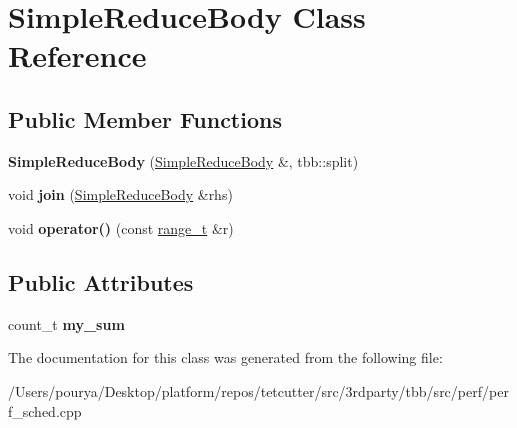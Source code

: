 \hypertarget{classSimpleReduceBody}{}\section{Simple\+Reduce\+Body Class Reference}
\label{classSimpleReduceBody}
\subsection*{Public Member Functions}
\begin{DoxyCompactItemize}
\item 
\hypertarget{classSimpleReduceBody_a0da14b73570b3e89b6ff63f257901a4f}{}{\bfseries Simple\+Reduce\+Body} (\hyperlink{classSimpleReduceBody}{Simple\+Reduce\+Body} \&, tbb\+::split)\label{classSimpleReduceBody_a0da14b73570b3e89b6ff63f257901a4f}

\item 
\hypertarget{classSimpleReduceBody_abd606341ba7702251e4dcf4df79bfbec}{}void {\bfseries join} (\hyperlink{classSimpleReduceBody}{Simple\+Reduce\+Body} \&rhs)\label{classSimpleReduceBody_abd606341ba7702251e4dcf4df79bfbec}

\item 
\hypertarget{classSimpleReduceBody_aacd3d6eab32aad3aa24d8014ab547632}{}void {\bfseries operator()} (const \hyperlink{classtbb_1_1blocked__range}{range\+\_\+t} \&r)\label{classSimpleReduceBody_aacd3d6eab32aad3aa24d8014ab547632}

\end{DoxyCompactItemize}
\subsection*{Public Attributes}
\begin{DoxyCompactItemize}
\item 
\hypertarget{classSimpleReduceBody_ae46cac7c55dd7558addd4a649bcfcee0}{}count\+\_\+t {\bfseries my\+\_\+sum}\label{classSimpleReduceBody_ae46cac7c55dd7558addd4a649bcfcee0}

\end{DoxyCompactItemize}


The documentation for this class was generated from the following file\+:\begin{DoxyCompactItemize}
\item 
/\+Users/pourya/\+Desktop/platform/repos/tetcutter/src/3rdparty/tbb/src/perf/perf\+\_\+sched.\+cpp\end{DoxyCompactItemize}
